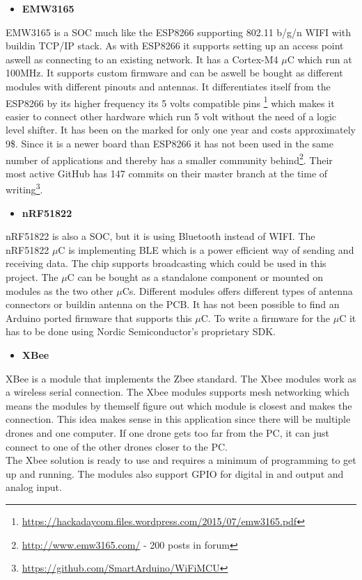 \begin{itemize}
	\item \textbf{EMW3165}
\end{itemize}
EMW3165 is a SOC much like the ESP8266 supporting 802.11 b/g/n WIFI with buildin TCP/IP stack. As with ESP8266 it supports setting up an access point aswell as connecting to an existing network. It has a Cortex-M4 $\mu$C which run at 100MHz. 
It supports custom firmware and can be aswell be bought as different modules with different pinouts and antennas.
It differentiates itself from the ESP8266 by its higher frequency its 5 volts compatible pins \footnote{\url{https://hackadaycom.files.wordpress.com/2015/07/emw3165.pdf}} which makes it easier to connect other hardware which run 5 volt without the need of a logic level shifter. It has been on the marked for only one year and costs approximately 9\$. Since it is a newer board than ESP8266 it has not been used in the same number of applications and thereby has a smaller community behind\footnote{\url{http://www.emw3165.com/} - 200 posts in forum }. Their most active GitHub has 147 commits on their master branch at the time of writing\footnote{\url{https://github.com/SmartArduino/WiFiMCU}}.

\begin{itemize}
	\item \textbf{nRF51822}
\end{itemize}
nRF51822 is also a SOC, but it is using Bluetooth instead of WIFI. The nRF51822 $\mu$C is implementing BLE which is a power efficient way of sending and receiving data. The chip supports broadcasting which could be used in this project. The $\mu$C can be bought as a standalone component or mounted on modules as the two other $\mu$Cs. Different modules offers different types of antenna connectors or buildin antenna on the PCB. It has not been possible to find an Arduino ported firmware that supports this $\mu$C. To write a firmware for the $\mu$C it has to be done using Nordic Semiconductor's proprietary SDK. 


\begin{itemize}
	\item \textbf{XBee}
\end{itemize}
XBee is a module that implements the Zbee standard. The Xbee modules work as a wireless serial connection. The Xbee modules supports mesh networking which means the modules by themself figure out which module is closest and makes the connection. This idea makes sense in this application since there will be multiple drones and one computer. If one drone gets too far from the PC, it can just connect to one of the other drones closer to the PC.\\
The Xbee solution is ready to use and requires a minimum of programming to get up and running. The modules also support GPIO for digital in and output and analog input.

